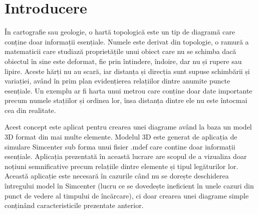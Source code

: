 \newpage
\section{Introducere}


În cartografie sau geologie, o hartă topologică este un tip de diagramă care conține doar informații esențiale. 
Numele este derivat din topologie, o ramură a matematicii care studiază proprietățile unui obiect care nu se schimba dacă 
obiectul în sine este deformat, fie prin întindere, îndoire, dar nu și rupere sau lipire. Aceste hărți nu au scară, iar distanța 
și direcția sunt supuse schimbării și variației, având în prim plan evidențierea relațiilor dintre anumite puncte esențiale. 
Un exemplu ar fi harta unui metrou care conține doar date importante precum numele stațiilor și ordinea lor, însa distanța 
dintre ele nu este întocmai cea din realitate. \newline

Acest concept este aplicat pentru crearea unei diagrame având la baza un model 3D format din mai multe elemente.
Modelul 3D este generat de aplicația de simulare Simcenter sub forma unui fisier .mdef care contine doar informații esențiale.
Aplicația prezentată în această lucrare are scopul de a vizualiza doar noțiuni semnificative precum relațiile dintre elemente
și tipul legăturilor lor. Această aplicație este necesară în cazurile când nu se dorește deschiderea întregului model în Simcenter
(lucru ce se dovedește ineficient în unele cazuri din punct de vedere al timpului de încărcare), ci doar crearea unei diagrame simple 
conținând caracteristicile prezentate anterior.\newline
